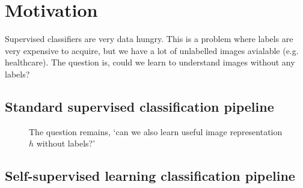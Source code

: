 \documentclass[11pt]{article}
\begin{document}


\tableofcontents

\clearpage

\section{Motivation}

Supervised classifiers are very data hungry. This is a problem where labels are very expensive to acquire, but we have a lot of unlabelled images avialable (e.g. healthcare). The question is, could we learn to understand images without any labels?

\subsection{Standard supervised classification pipeline}

\begin{figure}[H]
    \centering
    \caption*{The question remains, `can we also learn useful image representation $h$ without labels?'}
\end{figure}

\subsection{Self-supervised learning classification pipeline}
\end{document}
